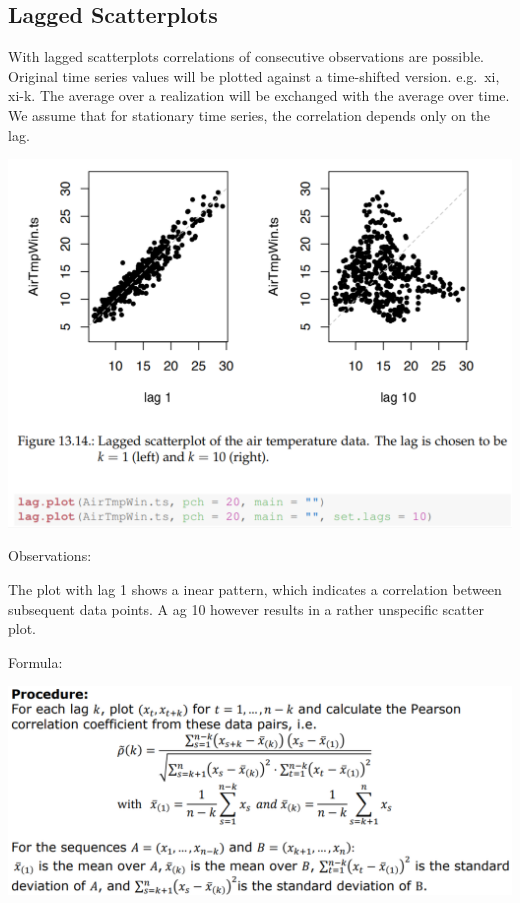 \documentclass[
]{article}
\begin{document}
\hypertarget{lagged-scatterplots}{%
\subsection{Lagged Scatterplots}\label{lagged-scatterplots}}

With lagged scatterplots correlations of consecutive observations are
possible. Original time series values will be plotted against a
time-shifted version. e.g.~xi, xi-k. The average over a realization will
be exchanged with the average over time. We assume that for stationary
time series, the correlation depends only on the lag.

\includegraphics[width=1\linewidth]{lagplot}

Observations:

The plot with lag 1 shows a inear pattern, which indicates a correlation
between subsequent data points. A ag 10 however results in a rather
unspecific scatter plot.

Formula:

\includegraphics[width=1\linewidth]{lag}
\end{document}

